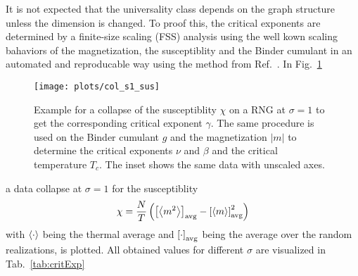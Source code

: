 It is not expected that the universality class depends on the graph
structure unless the dimension is changed.
To proof this, the critical exponents are determined by a finite-size
scaling (FSS) analysis using the well kown scaling bahaviors of the
magnetization, the susceptiblity and the Binder cumulant
in an automated and reproducable way using the
method from Ref.~\cite{autoscale2009}.
In Fig.~\ref{fig:collapse}
\begin{figure}[htb]
    \texttt{[image: plots/col\_s1\_sus]}
    \caption[Examples of Determining Critical Temperature and Exponents]
    {
        Example for a collapse of the susceptiblity \(\chi\) on a RNG at
        \(\sigma = 1\) to get the corresponding critical exponent $\gamma$.
        The same procedure is used on the Binder cumulant $g$ and the
        magnetization $|m|$ to determine the critical exponents
        \(\nu\) and \(\beta\) and the critical temperature \(T_c\).
        The inset shows the same data with unscaled axes.
    }
    \label{fig:collapse}
\end{figure}
a data collapse at $\sigma = 1$ for the susceptiblity
\[\chi = \frac{N}{T}\left(\left[ \left< m^2 \right> \right] _{\mathrm{avg}}-\left[ \left< m \right> \right] _{\mathrm{avg}}^2\right)\]
with $\left< \cdot \right>$ being the thermal average and $\left[ \cdot \right] _{\mathrm{avg}}$ being the
average over the random realizations, is plotted.
All obtained values for different $\sigma$ are visualized in Tab.~\ref{tab:critExp}
